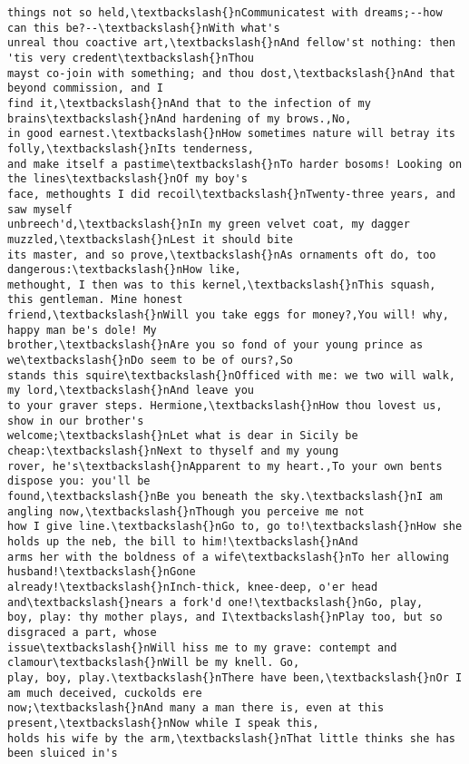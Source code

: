 \documentclass[11pt]{article}
\begin{document}
\begin{tcolorbox}[breakable, size=fbox, boxrule=.5pt, pad at break*=1mm, opacityfill=0]
\begin{Verbatim}[commandchars=\\\{\}]
things not so held,\textbackslash{}nCommunicatest with dreams;--how can this be?--\textbackslash{}nWith what's
unreal thou coactive art,\textbackslash{}nAnd fellow'st nothing: then 'tis very credent\textbackslash{}nThou
mayst co-join with something; and thou dost,\textbackslash{}nAnd that beyond commission, and I
find it,\textbackslash{}nAnd that to the infection of my brains\textbackslash{}nAnd hardening of my brows.,No,
in good earnest.\textbackslash{}nHow sometimes nature will betray its folly,\textbackslash{}nIts tenderness,
and make itself a pastime\textbackslash{}nTo harder bosoms! Looking on the lines\textbackslash{}nOf my boy's
face, methoughts I did recoil\textbackslash{}nTwenty-three years, and saw myself
unbreech'd,\textbackslash{}nIn my green velvet coat, my dagger muzzled,\textbackslash{}nLest it should bite
its master, and so prove,\textbackslash{}nAs ornaments oft do, too dangerous:\textbackslash{}nHow like,
methought, I then was to this kernel,\textbackslash{}nThis squash, this gentleman. Mine honest
friend,\textbackslash{}nWill you take eggs for money?,You will! why, happy man be's dole! My
brother,\textbackslash{}nAre you so fond of your young prince as we\textbackslash{}nDo seem to be of ours?,So
stands this squire\textbackslash{}nOfficed with me: we two will walk, my lord,\textbackslash{}nAnd leave you
to your graver steps. Hermione,\textbackslash{}nHow thou lovest us, show in our brother's
welcome;\textbackslash{}nLet what is dear in Sicily be cheap:\textbackslash{}nNext to thyself and my young
rover, he's\textbackslash{}nApparent to my heart.,To your own bents dispose you: you'll be
found,\textbackslash{}nBe you beneath the sky.\textbackslash{}nI am angling now,\textbackslash{}nThough you perceive me not
how I give line.\textbackslash{}nGo to, go to!\textbackslash{}nHow she holds up the neb, the bill to him!\textbackslash{}nAnd
arms her with the boldness of a wife\textbackslash{}nTo her allowing husband!\textbackslash{}nGone
already!\textbackslash{}nInch-thick, knee-deep, o'er head and\textbackslash{}nears a fork'd one!\textbackslash{}nGo, play,
boy, play: thy mother plays, and I\textbackslash{}nPlay too, but so disgraced a part, whose
issue\textbackslash{}nWill hiss me to my grave: contempt and clamour\textbackslash{}nWill be my knell. Go,
play, boy, play.\textbackslash{}nThere have been,\textbackslash{}nOr I am much deceived, cuckolds ere
now;\textbackslash{}nAnd many a man there is, even at this present,\textbackslash{}nNow while I speak this,
holds his wife by the arm,\textbackslash{}nThat little thinks she has been sluiced in's

\end{Verbatim}
\end{tcolorbox}
\end{document}

